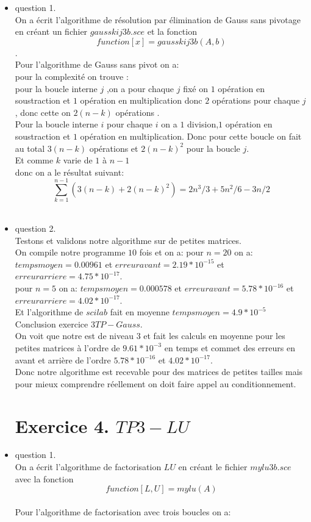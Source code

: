 \documentclass[]{article}
\begin{document}
\begin{itemize}
\begin{itemize}
\begin{itemize}
\item{question 1.\\}
On a écrit l'algorithme de résolution par élimination de Gauss sans pivotage en créant un fichier $gausskij3b.sce$ et la fonction $$function[x]=gausskij3b(A,b)$$.\\
Pour l'algorithme de Gauss sans pivot on a:\\

pour la complexité on trouve :\\pour la boucle interne $j$ ,on a pour chaque $j$ fixé on $1$ opération en soustraction et $1$ opération en multiplication donc $2$ opérations pour chaque $j$, donc cette on $2(n - k)$ opérations .\\
Pour la boucle interne $i$ pour chaque $i$ on a $1$ division,$1$ opération en soustraction et $1$ opération en multiplication. Donc pour cette boucle on fait au total $3(n-k)$ opérations et $2(n-k)^{2}$ pour la boucle $j$.\\ Et comme $k$ varie de $1$ à $n - 1$ \\
donc on a le résultat suivant: $$\sum_{k=1}^{n-1}(3(n - k) +2(n-k)^{2})=2n^{3}/3  +5n^{2}/6 -3n/2$$\\
\item{question 2.\\}
Testons et validons notre algorithme sur de petites matrices.\\
On compile notre programme $10$ fois et on a:
pour $n=20$ on a: $tempsmoyen= 0.00961$ et $erreuravant= 2.19*10^{-15}$ et $erreurarriere=4.75*10^{-17}$.\\
pour $n=5$ on a: $tempsmoyen= 0.000578$ et $erreuravant= 5.78*10^{-16}$ et $erreurarriere=4.02*10^{-17}$.\\
Et l'algorithme de $scilab$ fait en moyenne $tempsmoyen=4.9*10^{-5}$\\
Conclusion exercice $3 TP- Gauss$.\\
On voit que notre est de niveau $3$ et fait les calculs en moyenne pour les petites matrices à l'ordre de $9.61*10^{-3}$ en temps et commet des erreurs en avant et arrière de l'ordre $5.78*10^{-16}$  et $4.02*10^{-17}$.\\
Donc notre algorithme est recevable pour des matrices de petites tailles mais pour mieux comprendre réellement on doit faire appel au conditionnement.\\

\section{Exercice 4. $TP3 - LU$}
\item{question 1.\\}
On a écrit l'algorithme de factorisation $LU$ en créant le fichier $mylu3b.sce$ avec la fonction $$function[L,U] = mylu(A)$$\\
Pour l'algorithme de factorisation avec trois boucles on a:\\


\end{itemize}
\end{itemize}
\end{itemize}
\end{document}
